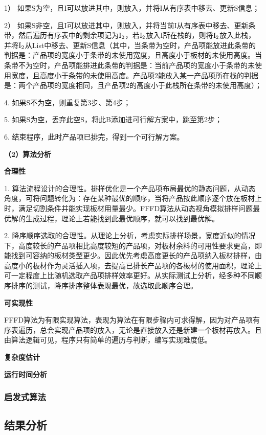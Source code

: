 \documentclass[bwprint]{gmcmthesis}
\begin{document}
	1） 如果S为空，且I可以放进其中，则放入，并将I从有序表中移去、更新S信息；
	
	2） 如果S非空，且I可以放进其中，则放入，并将当前I从有序表中移去、更新条带，然后遍历有序表中的剩余项记为$\rm{I}_2$，若$\rm{I}_2$放入I所在栈的，则将$\rm{I}_2$放入此栈，并将$\rm{I}_2$从List中移去、更新S信息（其中，当条带为空时，产品项能放进此条带的判据是：产品项的宽度小于条带的未使用宽度，且高度小于板材的未使用高度。当条带不为空时，产品项能排进此条带的判据是：当前产品项的宽度小于条带的未使用宽度，且高度小于条带的未使用高度。产品项2能放入某一产品项所在栈的判据是：两个产品项的宽度相同，且产品项2的高度小于此栈所在条带的未使用高度）；
	
	4. 如果S不为空，则重复第3步、第4步；
	
	5. 如果S为空，丢弃此空S，将此B添加进可行解方案中，跳至第2步；
	
	6. 结束程序，此时产品项已排完，得到一个可行解方案。
	
	
	\textbf{（2）算法分析}
	
	\textbf{合理性} 
	
	1. 算法流程设计的合理性。排样优化是一个产品项布局最优的静态问题，从动态角度，可将问题转化为：存在某种最优的顺序，当将产品按此顺序逐个放在板材上时，满足切割条件并能实现板材用量最少。FFFD算法从动态视角模拟排样问题最优解的生成过程，理论上若能找到此最优顺序，就可以找到最优解。
	
	2. 降序顺序选取的合理性。从理论上分析，考虑实际排样场景，宽度近似的情况下，高度较长的产品项相比高度较短的产品项，对板材余料的可用性要求更高，即能找到可容纳的板材类型更少。因此优先考虑高度更长的产品项纳入板材排样，由高度小的板材作为灵活插入项，去提高已排长产品项的各板材的使用面积，理论上可一定程度上比随机选取产品项排样效率更好。从实际测试上分析，经多种不同顺序排序的测试，降序排序整体表现最优，故选取此顺序合理。
	
	\textbf{可实现性}  
	
	FFFD算法为有限实现算法，表现为算法在有限步骤内可求得解，因为对产品项有序表遍历，总会实现产品项的放入，无论是直接放入还是新建一个板材再放入。且由算法逻辑可见，程序只有简单的遍历与判断，编写实现难度低。
	
	\textbf{复杂度估计}
	
	
	\textbf{运行时间分析} 
	
	
\subsubsection{启发式算法}



\subsection{结果分析}
\end{document}
